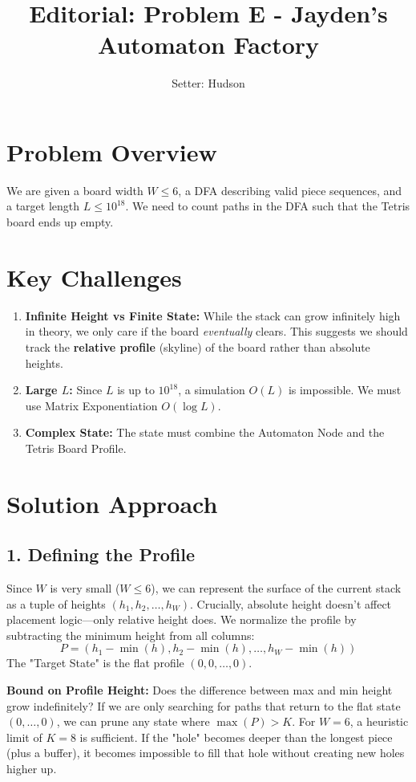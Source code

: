 \documentclass[11pt]{article}
\title{\textbf{Editorial: Problem E - Jayden's Automaton Factory}}
\author{Setter: Hudson}
\date{}
\begin{document}
\maketitle

\section*{Problem Overview}
We are given a board width $W \le 6$, a DFA describing valid piece sequences, and a target length $L \le 10^{18}$. We need to count paths in the DFA such that the Tetris board ends up empty.

\section*{Key Challenges}
\begin{enumerate}
    \item \textbf{Infinite Height vs Finite State:} While the stack can grow infinitely high in theory, we only care if the board \textit{eventually} clears. This suggests we should track the \textbf{relative profile} (skyline) of the board rather than absolute heights.
    \item \textbf{Large $L$:} Since $L$ is up to $10^{18}$, a simulation $O(L)$ is impossible. We must use Matrix Exponentiation $O(\log L)$.
    \item \textbf{Complex State:} The state must combine the Automaton Node and the Tetris Board Profile.
\end{enumerate}

\section*{Solution Approach}

\subsection*{1. Defining the Profile}
Since $W$ is very small ($W \le 6$), we can represent the surface of the current stack as a tuple of heights $(h_1, h_2, \dots, h_W)$.
Crucially, absolute height doesn't affect placement logic—only relative height does.
We normalize the profile by subtracting the minimum height from all columns:
$$ P = (h_1 - \min(h), h_2 - \min(h), \dots, h_W - \min(h)) $$
The "Target State" is the flat profile $(0, 0, \dots, 0)$.

\textbf{Bound on Profile Height:} 
Does the difference between max and min height grow indefinitely?
If we are only searching for paths that return to the flat state $(0,\dots,0)$, we can prune any state where $\max(P) > K$.
For $W=6$, a heuristic limit of $K=8$ is sufficient. If the "hole" becomes deeper than the longest piece (plus a buffer), it becomes impossible to fill that hole without creating new holes higher up.
\end{document}

